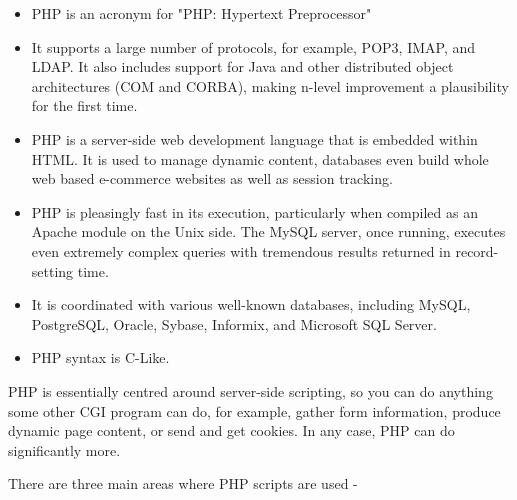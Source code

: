 \documentclass[../thesis.tex]{subfiles}
\begin{document}
\begin{itemize}
  \item PHP is an acronym for "PHP: Hypertext Preprocessor"
  \item It supports a large number of protocols, for example, POP3, IMAP, and LDAP. It also includes support for Java and other distributed object architectures (COM and CORBA), making n-level improvement a plausibility for the first time.
  \item PHP is a server-side web development language that is embedded within HTML. It is used to manage dynamic content, databases even build whole web based e-commerce websites as well as session tracking. 
  \item PHP is pleasingly fast in its execution, particularly when compiled as an Apache module on the Unix side. The MySQL server, once running, executes even extremely complex queries with tremendous results returned in record-setting time.
  \item It is coordinated with various well-known databases, including MySQL, PostgreSQL, Oracle, Sybase, Informix, and Microsoft SQL Server.   
  \item PHP syntax is C-Like.  
\end{itemize}
    
PHP is essentially centred around server-side scripting, so you can do anything some other CGI program can do, for example, gather form information, produce dynamic page content, or send and get cookies. In any case, PHP can do significantly more.
\newline
    
There are three main areas where PHP scripts are used -
  
\end{document}

